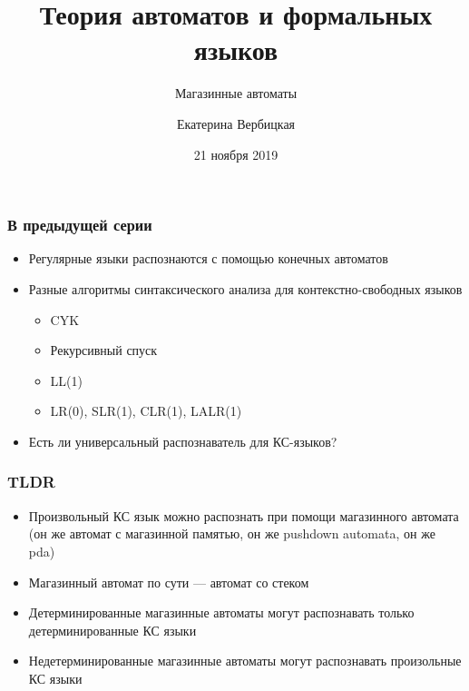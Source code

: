 \documentclass[dvipsnames]{beamer}
\title[]{Теория автоматов и формальных языков}
\subtitle[]{Магазинные автоматы}
\institute[]{
Санкт-Петербургский государственный электротехнический университет <<ЛЭТИ>>\\
}
\author[]{Екатерина Вербицкая}
\date{21 ноября 2019}
\begin{document}
{
  \begin{frame}
    \titlepage
  \end{frame}
}

\begin{frame}[fragile]
  \frametitle{В предыдущей серии}
  \begin{itemize}
    \item Регулярные языки распознаются с помощью конечных автоматов
    \item Разные алгоритмы синтаксического анализа для контекстно-свободных языков
    \begin{itemize}
    	\item CYK
    	\item Рекурсивный спуск
    	\item LL(1)
    	\item LR(0), SLR(1), CLR(1), LALR(1)
    \end{itemize}
    \item Есть ли универсальный распознаватель для КС-языков?
  \end{itemize}
\end{frame}

\begin{frame}[fragile]
  \frametitle{TLDR}
  \begin{itemize}
  	\item Произвольный КС язык можно распознать при помощи магазинного автомата (он же автомат с магазинной памятью, он же pushdown automata, он же pda)
  	\item Магазинный автомат по сути --- автомат со стеком
  	\item Детерминированные магазинные автоматы могут распознавать только детерминированные КС языки
  	\item Недетерминированные магазинные автоматы могут распознавать произольные КС языки
  \end{itemize}
\end{frame}
\end{document}
